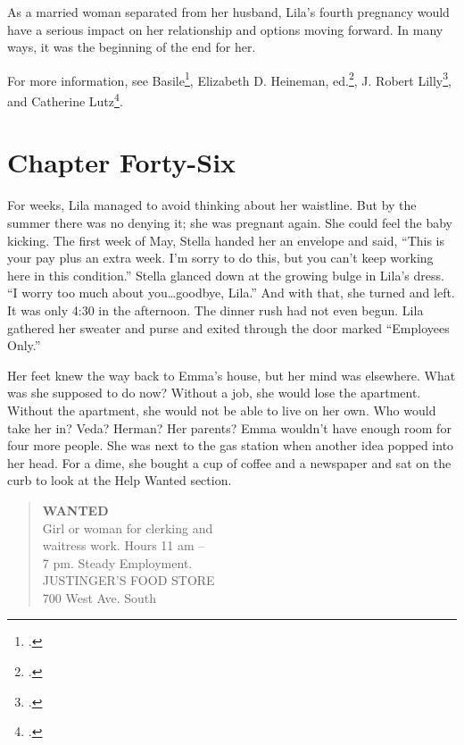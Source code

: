 \documentclass[
  letterpaper,
]{book}
\begin{document}
As a married woman separated from her husband, Lila's fourth pregnancy
would have a serious impact on her relationship and options moving
forward. In many ways, it was the beginning of the end for her.

For more information, see Basile\footnote{.}, Elizabeth D. Heineman,
ed.\footnote{.}, J. Robert
Lilly\footnote{.}, and Catherine Lutz\footnote{.}.


\chapter{Chapter Forty-Six}\label{chapter-forty-six}

For weeks, Lila managed to avoid thinking about her waistline. But by
the summer there was no denying it; she was pregnant again. She could
feel the baby kicking. The first week of May, Stella handed her an
envelope and said, ``This is your pay plus an extra week. I'm sorry to
do this, but you can't keep working here in this condition.'' Stella
glanced down at the growing bulge in Lila's dress. ``I worry too much
about you\ldots goodbye, Lila.'' And with that, she turned and left. It
was only 4:30 in the afternoon. The dinner rush had not even begun. Lila
gathered her sweater and purse and exited through the door marked
``Employees Only.''

Her feet knew the way back to Emma's house, but her mind was elsewhere.
What was she supposed to do now? Without a job, she would lose the
apartment. Without the apartment, she would not be able to live on her
own. Who would take her in? Veda? Herman? Her parents? Emma wouldn't
have enough room for four more people. She was next to the gas station
when another idea popped into her head. For a dime, she bought a cup of
coffee and a newspaper and sat on the curb to look at the Help Wanted
section.

\begin{quote}
\textbf{WANTED}\\
Girl or woman for clerking and\\
waitress work. Hours 11 am --\\
7 pm. Steady Employment.\\
JUSTINGER'S FOOD STORE\\
700 West Ave. South
\end{quote}
\end{document}
